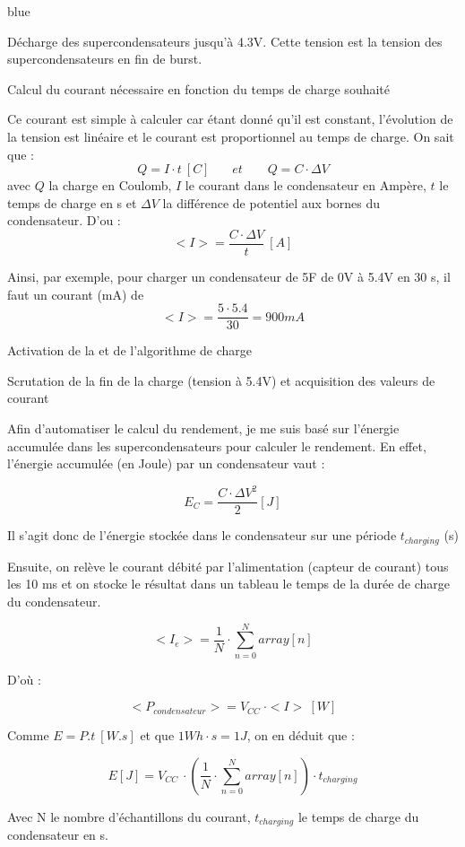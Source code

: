 \begin{items}{blue}{\Bullet}
    \item Décharge des supercondensateurs jusqu'à 4.3V. Cette tension est la tension des supercondensateurs en fin de burst.
    \item Calcul du courant nécessaire en fonction du temps de charge souhaité
    
    Ce courant est simple à calculer car étant donné qu'il est constant, l'évolution de la tension est linéaire et le courant est proportionnel au temps de charge. On sait que : 
        $$ Q = I\cdot t~[C] ~~~~~~~~ et ~~~~~~~~~Q = C \cdot \Delta  V$$ avec $Q$ la charge en Coulomb, $I$ le courant dans le condensateur en Ampère, $t$ le temps de charge en s et $\Delta V$ la différence de potentiel aux bornes du condensateur.
    D'ou :
    $$ <I> = \frac{C \cdot\Delta V}{t}~[A]$$

Ainsi, par exemple, pour charger un condensateur de 5F de 0V à 5.4V en 30 s, il faut un courant (mA) de 
$$ <I> = \frac{5 \cdot 5.4}{30} = 900 mA$$
    \item Activation de la  et de l'algorithme de charge
    \item Scrutation de la fin de la charge (tension à 5.4V) et acquisition des valeurs de courant
\end{items}

Afin d'automatiser le calcul du rendement, je me suis basé sur l'énergie accumulée dans les supercondensateurs pour calculer le rendement. En effet, l'énergie accumulée (en Joule) par un condensateur vaut : 

$$ E_C = \frac{C\cdot \Delta V^2}{2} [J] $$

Il s'agit donc de l'énergie stockée dans le condensateur sur une période $t_{charging} $ (s)

Ensuite, on relève le courant débité par l'alimentation (capteur de courant) tous les 10 ms et on stocke le résultat dans un tableau le temps de la durée de charge du condensateur.

$$ <I_e> = \frac{1}{N} \cdot \sum_{n=0}^{N}{array[n]}$$

D'où : 

$$ <P_{condensateur}> = V_{CC}~\cdot <I>~[W]$$

Comme $E = P.t~[W.s] $ et que $ 1Wh\cdot s = 1 J$, on en déduit que :

$$ E[J] =  V_{CC}~ \cdot (\frac{1}{N} \cdot \sum_{n=0}^{N}{array[n]}) \cdot t_{charging} $$


Avec N le nombre d'échantillons du courant, $t_{charging}$ le temps de charge du condensateur en s.\\


